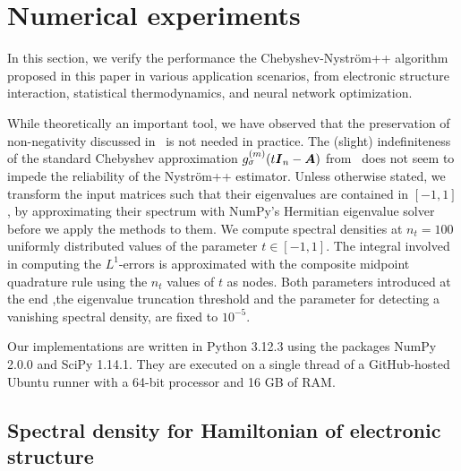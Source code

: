 
\section{Numerical experiments}
\label{sec:results}


In this section, we verify the performance the Chebyshev-Nyström++ algorithm proposed in this paper in various application scenarios, from electronic structure interaction, statistical thermodynamics, and neural network optimization.

While theoretically an important tool, we have observed that the preservation of non-negativity discussed in~ is not needed in practice. The (slight) indefiniteness of the standard Chebyshev approximation $g_{\sigma}^{(m)}(t \boldsymbol{I}_n - \boldsymbol{A})$ from~ does not seem to impede the reliability of the Nyström++ estimator. Unless otherwise stated, we transform the input matrices such that their eigenvalues are contained in $[-1, 1]$, by approximating their spectrum with NumPy's Hermitian eigenvalue solver before we apply the methods to them. We compute spectral densities at $n_t = 100$ uniformly distributed values of the parameter $t \in [-1, 1]$. The integral involved in computing the $L^1$-errors is approximated with the composite midpoint quadrature rule using the $n_t$ values of $t$ as nodes. Both parameters introduced at the end ,the eigenvalue truncation threshold and the parameter for detecting a vanishing spectral density, are fixed to $10^{-5}$.

Our implementations are written in Python 3.12.3 using the packages NumPy 2.0.0 and SciPy 1.14.1. They are executed on a single thread of a GitHub-hosted Ubuntu runner with a 64-bit processor and 16 GB of RAM. 

\subsection{Spectral density for Hamiltonian of electronic structure}
\label{subsec:hamiltonian}

